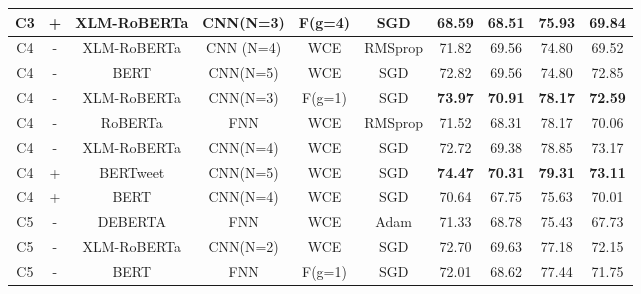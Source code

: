 \begin{table*}[h!]
\begin{tabular}{c  |c |c c  c  c|c c  c  c}
		C3 & + & XLM-RoBERTa&  CNN(N=3) & F(g=4) & SGD & 68.59 & 68.51 & 75.93& 69.84\\
\hline
\hline
		C4 & - & XLM-RoBERTa  &CNN (N=4)&  WCE & RMSprop&  71.82 & 69.56 & 74.80&69.52\\
		C4 & - &BERT& CNN(N=5) &  WCE & SGD &  72.82 & 69.56 & 74.80&72.85\\
		C4& - &XLM-RoBERTa & CNN(N=3) &  F(g=1)&SGD &  \textbf{73.97} & \textbf{70.91} & \textbf{78.17} & \textbf{72.59}\\
		C4& - &RoBERTa& FNN &  WCE&RMSprop &  71.52 & 68.31 & 78.17&70.06\\
		C4& - & XLM-RoBERTa &CNN(N=4) &  WCE&SGD &  72.72 & 69.38 & 78.85&73.17\\
		
		
		C4& + &  BERTweet&CNN(N=5) &  WCE&SGD &  \textbf{74.47} & \textbf{70.31} & \textbf{79.31}&\textbf{73.11}\\
		
		C4& + & BERT &CNN(N=4) &  WCE&SGD &  70.64 & 67.75 & 75.63& 70.01\\
		
\hline
\hline
		C5 & -&DEBERTA &  FNN & WCE & Adam &  71.33 & 68.78 & 75.43&67.73\\
		C5 & - &XLM-RoBERTa  &  CNN(N=2) & WCE&SGD &  72.70 & 69.63 & 77.18&72.15\\
		C5 & -&BERT &  FNN & F(g=1)&SGD &  72.01 & 68.62 & 77.44&71.75\\
		

\end{tabular}
\end{table*}
